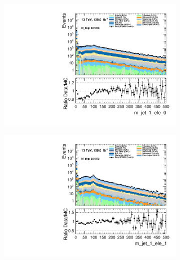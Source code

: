 \begin{figure}
    \centering
    \begin{subfigure}{.49\textwidth}
        \includegraphics[width=\textwidth]{Figures/MC_Data_comp/m_jet_1_ele_0.pdf}
        \caption{}
        \label{fig:et}
    \end{subfigure}
    \hfill
    \begin{subfigure}{.49\textwidth}
        \includegraphics[width=\textwidth]{Figures/MC_Data_comp/m_jet_1_ele_1.pdf}
        \caption{ }
        \label{fig:flcp}
    \end{subfigure}
    \hfill 
    \begin{subfigure}{.49\textwidth}

\end{subfigure}
\end{figure}
